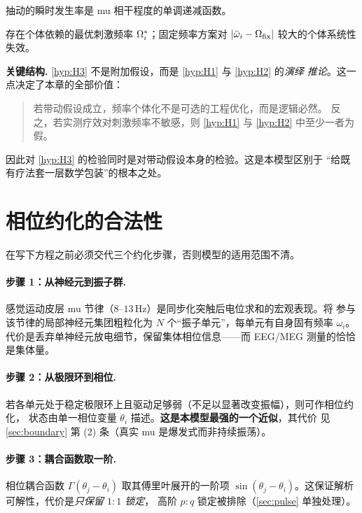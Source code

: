 \begin{hypo}[门控命题]\label{hyp:H2}
抽动的瞬时发生率是 mu 相干程度的单调递减函数。
\end{hypo}

\begin{hypo}[个体化命题]\label{hyp:H3}
存在个体依赖的最优刺激频率 $\Omega^{*}_i$；固定频率方案对
$|\bar{\omega}_i-\Omega_{\mathrm{fix}}|$ 较大的个体系统性失效。
\end{hypo}

\noindent\textbf{关键结构.}
\cref{hyp:H3} 不是附加假设，而是 \cref{hyp:H1} 与 \cref{hyp:H2} 的\emph{演绎
推论}。这一点决定了本章的全部价值：
%
\begin{quote}
若带动假设成立，频率个体化不是可选的工程优化，而是逻辑必然。
反之，若实测疗效对刺激频率不敏感，则 \cref{hyp:H1} 与 \cref{hyp:H2}
中至少一者为假。
\end{quote}
%
因此对 \cref{hyp:H3} 的检验同时是对带动假设本身的检验。这是本模型区别于
“给既有疗法套一层数学包装”的根本之处。

\section{相位约化的合法性}
\label{sec:reduction}

在写下方程之前必须交代三个约化步骤，否则模型的适用范围不清。

\paragraph{步骤 1：从神经元到振子群.}
感觉运动皮层 mu 节律（$8$–$13\,$Hz）是同步化突触后电位求和的宏观表现。将
参与该节律的局部神经元集团粗粒化为 $N$ 个“振子单元”，每单元有自身固有频率
$\omega_i$。代价是丢弃单神经元放电细节，保留集体相位信息——而
EEG/MEG 测量的恰恰是集体量。

\paragraph{步骤 2：从极限环到相位.}
若各单元处于稳定极限环上且驱动足够弱（不足以显著改变振幅），则可作相位约化，
状态由单一相位变量 $\theta_i$ 描述。\textbf{这是本模型最强的一个近似}，其代价
见 \cref{sec:boundary} 第 (2) 条（真实 mu 是爆发式而非持续振荡）。

\paragraph{步骤 3：耦合函数取一阶.}
相位耦合函数 $\Gamma(\theta_j-\theta_i)$ 取其傅里叶展开的一阶项
$\sin(\theta_j-\theta_i)$。这保证解析可解性，代价是\emph{只保留 $1{:}1$ 锁定}，
高阶 $p{:}q$ 锁定被排除（\cref{sec:pulse} 单独处理）。

